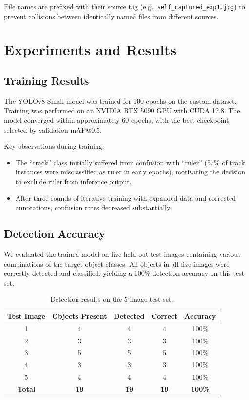 \documentclass[12pt]{article}
\begin{document}
File names are prefixed with their source tag (e.g., \texttt{self\_captured\_exp1.jpg}) to prevent collisions between identically named files from different sources.

\section{Experiments and Results}

\subsection{Training Results}

The YOLOv8-Small model was trained for 100 epochs on the custom dataset. Training was performed on an NVIDIA RTX 5090 GPU with CUDA 12.8. The model converged within approximately 60 epochs, with the best checkpoint selected by validation mAP@0.5.

Key observations during training:
\begin{itemize}[noitemsep]
  \item The ``track'' class initially suffered from confusion with ``ruler'' (57\% of track instances were misclassified as ruler in early epochs), motivating the decision to exclude ruler from inference output.
  \item After three rounds of iterative training with expanded data and corrected annotations, confusion rates decreased substantially.
\end{itemize}

\subsection{Detection Accuracy}

We evaluated the trained model on five held-out test images containing various combinations of the target object classes. All objects in all five images were correctly detected and classified, yielding a 100\% detection accuracy on this test set.

\begin{table}[H]
  \centering
  \caption{Detection results on the 5-image test set.}
  \label{tab:results}
  \begin{tabular}{ccccc}
    \toprule
    Test Image & Objects Present & Detected & Correct & Accuracy \\
    \midrule
    1 & 4 & 4 & 4 & 100\% \\
    2 & 3 & 3 & 3 & 100\% \\
    3 & 5 & 5 & 5 & 100\% \\
    4 & 3 & 3 & 3 & 100\% \\
    5 & 4 & 4 & 4 & 100\% \\
    \midrule
    \textbf{Total} & \textbf{19} & \textbf{19} & \textbf{19} & \textbf{100\%} \\
    \bottomrule
  \end{tabular}
\end{table}
\end{document}
